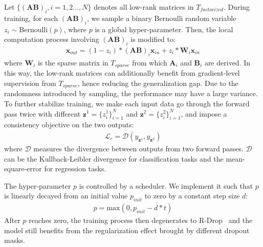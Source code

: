Let $\{(\bm{A}\bm{B})_i, i=1,2...,N\}$ denotes all low-rank matrices in $T_{factorized}$. During training, for each $(\bm{A}\bm{B})_i$, we sample a binary Bernoulli random variable $z_i\sim \text{Bernoulli}(p)$, where $p$ is a global hyper-parameter. Then, the local computation process involving $(\bm{A}\bm{B})_i$ is modified to:
\begin{align}
	\bm{x}_{out} = (1-z_i)*(\bm{A}\bm{B})_i \bm{x}_{in} + z_i * \bm{W}_i\bm{x}_{in}
\end{align}
where $\bm{W}_i$ is the sparse matrix in $T_{sparse}$ from which $\bm{A}_i$ and $\bm{B}_i$ are derived. In this way, the low-rank matrices can additionally benefit from gradient-level supervision from  $T_{sparse}$, hence reducing the generalization gap. Due to the randomness introduced by sampling, the performance may have a large variance. To further stabilize training, we make each input data go through the forward pass twice with different $\bm{z}^1=\{z_i^1\}_{i=1}^{N}$ and $\bm{z}^2=\{z_i^2\}_{i=1}^{N}$, and impose a consistency objective on the two outputs:
\begin{align}
	\mathcal{L}_{c}=\mathcal{D}(y_{\bm{z}^1}, y_{\bm{z}^2})
\end{align}
where $\mathcal{D}$ measures the divergence between outputs from two forward passes. $\mathcal{D}$ can be the Kullback-Leibler divergence for classification tasks and  the mean-square-error for regression tasks.

The hyper-parameter $p$ is controlled by a scheduler. We implement it such that $p$ is linearly decayed from an initial value $p_{init}$ to zero by a constant step size $d$:
\begin{align}
	p = \text{max}(0, p_{init}-d*t)
\end{align}
After $p$ reaches zero, the training process then degenerates to R-Drop~\cite{rdrop} and the model still benefits from the regularization effect brought by different dropout masks.
